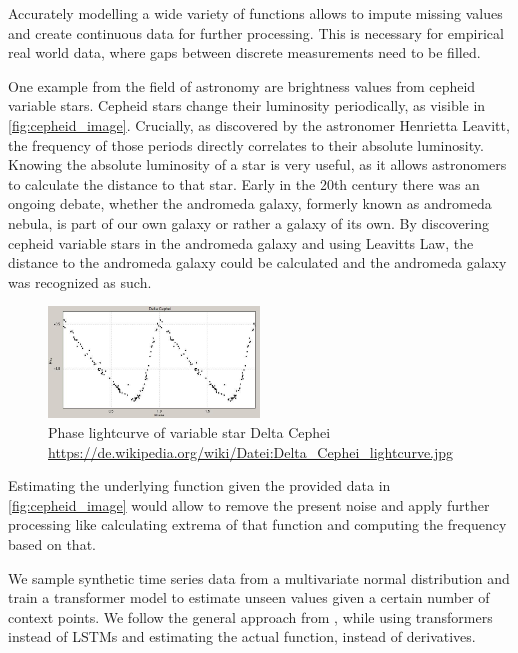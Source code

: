 Accurately modelling a wide variety of functions allows to impute missing values and create continuous data for further processing. This is necessary for empirical real world data, where gaps between discrete measurements need to be filled. 

One example from the field of astronomy are brightness values from cepheid variable stars. Cepheid stars change their luminosity periodically, as visible in \autoref{fig:cepheid_image}. Crucially, as discovered by the astronomer Henrietta Leavitt, the frequency of those periods directly correlates to their absolute luminosity. Knowing the absolute luminosity of a star is very useful, as it allows astronomers to calculate the distance to that star. Early in the 20th century there was an ongoing debate, whether the andromeda galaxy, formerly known as andromeda nebula, is part of our own galaxy or rather a galaxy of its own. By discovering cepheid variable stars in the andromeda galaxy and using Leavitts Law, the distance to the andromeda galaxy could be calculated and the andromeda galaxy was recognized as such. \cite{gaßnerAstroBook}

\begin{figure}[h]
	\centering
	\includegraphics[width = 0.5\textwidth]{figures/Cephei}
	\caption{Phase lightcurve of variable star Delta Cephei \tiny\url{ https://de.wikipedia.org/wiki/Datei:Delta_Cephei_lightcurve.jpg}}
	\label{fig:cepheid_image}
\end{figure}

Estimating the underlying function given the provided data in \autoref{fig:cepheid_image} would allow to remove the present noise and apply further processing like calculating extrema of that function and computing the frequency based on that. 

We sample synthetic time series data from a multivariate normal distribution and train a transformer model to estimate unseen values given a certain number of context points. We follow the general approach from \citet{seifner2025zeroshotimputationfoundationinference}, while using transformers instead of LSTMs and estimating the actual function, instead of derivatives.